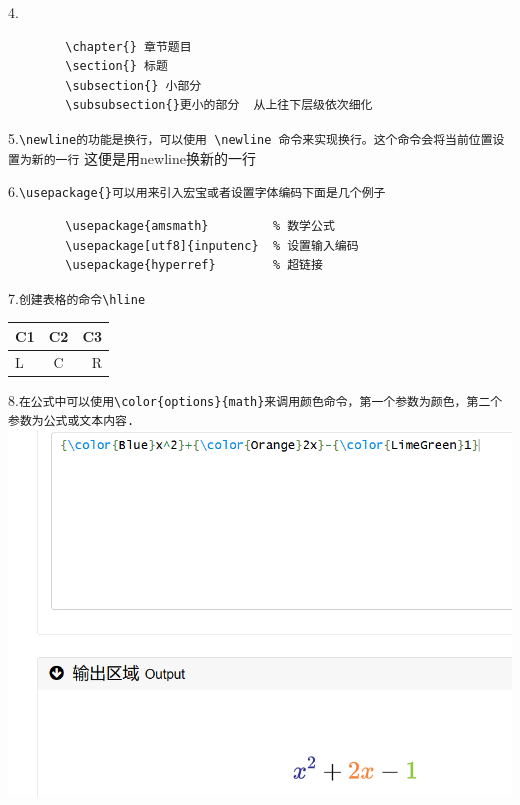 \documentclass{article}
\begin{document}
	4.\begin{verbatim}
		\chapter{} 章节题目
		\section{} 标题
		\subsection{} 小部分
		\subsubsection{}更小的部分  从上往下层级依次细化
	\end{verbatim}
	
	5.\verb|\newline的功能是换行，可以使用 \newline 命令来实现换行。这个命令会将当前位置设置为新的一行|
	这便是用newline换新的一行\newline 
	
	6.\verb|\usepackage{}可以用来引入宏宝或者设置字体编码下面是几个例子|\begin{verbatim}
		\usepackage{amsmath}         % 数学公式
		\usepackage[utf8]{inputenc}  % 设置输入编码
		\usepackage{hyperref}        % 超链接
	\end{verbatim}
	
	7.\verb|创建表格的命令\hline|
	
	\begin{tabular}{|l|c|r|}
		\hline
		C1 & C2 & C3 \\
		\hline
		L & C & R \\
		\hline
	\end{tabular}
	\newline
	
	8.\verb|在公式中可以使用\color{options}{math}来调用颜色命令，第一个参数为颜色，第二个参数为公式或文本内容.|
	\includegraphics[width=\textwidth]{yanse.png}
	
\end{document}
